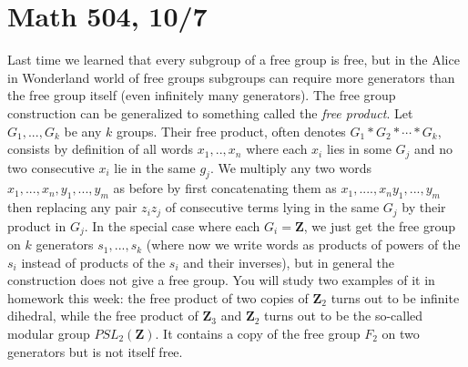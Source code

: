 \documentclass[10pt]{article}
\begin{document}
\section*{Math 504, 10/7}

Last time we learned that every subgroup of a free group is free, but in
the Alice in Wonderland world of free groups subgroups can require more
generators than the free group itself (even infinitely many generators).
The free group construction can be generalized to something called the
{\sl free product}. Let $G_1,...,G_k$ be any $k$ groups. Their free
product, often denotes $G_1\ast G_2\ast\cdots\ast G_k$, consists by
definition of all words $x_1,..,x_n$ where each $x_i$ lies in some $G_j$
and no two consecutive $x_i$ lie in the same $g_j$. We multiply any two
words $x_1,...,x_n,y_1,...,y_m$ as before by first concatenating them as
$x_1,....,x_n y_1,...,y_m$ then replacing any pair $z_i z_j$ of
consecutive terms lying in the same $G_j$ by their product in $G_j$. In
the special case where each $G_i= \mathbf{Z}$, we just get the free
group on $k$ generators $s_1,...,s_k$ (where now we write words as
products of powers of the $s_i$ instead of products of the $s_i$ and
their inverses), but in general the construction does not give a free
group. You will study two examples of it in homework this week: the free
product of two copies of $\mathbf{Z}_2$ turns out to be infinite
dihedral, while the free product of $\mathbf{Z}_3$ and $\mathbf{Z}_2$
turns out to be the so-called modular group $PSL_2(\mathbf{Z})$. It
contains a copy of the free group $F_2$ on two generators but is not
itself free.
\end{document}
